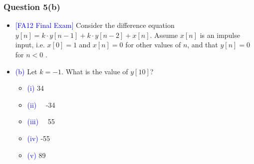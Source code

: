 \documentclass{beamer}
\newcommand{\blue}[1]{\textcolor{blue}{#1}}
\begin{document}

\begin{frame}
\frametitle{Question 5(b)}

\begin{itemize} \itemsep1pt \parskip0pt 
  \item[] \blue{[FA12 Final Exam]} Consider the difference equation $y[n] = k \cdot y[n-1] + k \cdot y[n-2] + x[n]$. \newline Assume $x[n]$ is an impulse input, i.e. $x[0] = 1$ and $x[n] = 0$ for other values of $n$, and that $y[n] = 0$ for $n < 0$ .
\end{itemize}

\vspace{8 mm}

\begin{itemize} \itemsep1pt \parskip0pt 
  \item[] \blue{(b)} Let $k = -1$. What is the value of $y[10]$?
  \begin{itemize} \itemsep1pt \parskip0pt 
  	\item[] \blue{(i)} \hspace{4 mm}34
  	\item[] \blue{(ii)} ~~-34
  	\item[] \blue{(iii)} ~~55
  	\item[] \blue{(iv)} \hspace{1.5 mm}-55
  	\item[] \blue{(v)} \hspace{2 mm} 89
  \end{itemize}
\end{itemize}
\vspace{6 cm}

\end{frame}

\end{document}
